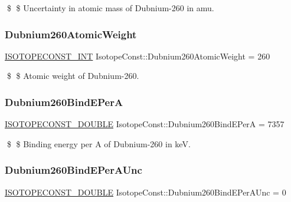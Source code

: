 \$ \$ Uncertainty in atomic mass of Dubnium-\/260 in amu. \mbox{\label{group___isotope_const-_dubnium-_db260_ga7059e4e33c247bd00a7efe8e8356bbd3}} 
\subsubsection{\texorpdfstring{Dubnium260\+Atomic\+Weight}{Dubnium260AtomicWeight}}
{\footnotesize\ttfamily \mbox{\hyperlink{group___isotope_const-_macros_ga5f18360b3e99483a35c32d789e62621c}{I\+S\+O\+T\+O\+P\+E\+C\+O\+N\+S\+T\+\_\+\+I\+NT}} Isotope\+Const\+::\+Dubnium260\+Atomic\+Weight = 260}

\$ \$ Atomic weight of Dubnium-\/260. \mbox{\label{group___isotope_const-_dubnium-_db260_ga88ccf073738560523b8892c3d4b61dd8}} 
\subsubsection{\texorpdfstring{Dubnium260\+Bind\+E\+PerA}{Dubnium260BindEPerA}}
{\footnotesize\ttfamily \mbox{\hyperlink{group___isotope_const-_macros_ga8f45a7272ce02c0b4c65c44636ed719a}{I\+S\+O\+T\+O\+P\+E\+C\+O\+N\+S\+T\+\_\+\+D\+O\+U\+B\+LE}} Isotope\+Const\+::\+Dubnium260\+Bind\+E\+PerA = 7357}

\$ \$ Binding energy per A of Dubnium-\/260 in keV. \mbox{\label{group___isotope_const-_dubnium-_db260_ga51fdf24b8e566b87c4753aa0a578e65e}} 
\subsubsection{\texorpdfstring{Dubnium260\+Bind\+E\+Per\+A\+Unc}{Dubnium260BindEPerAUnc}}
{\footnotesize\ttfamily \mbox{\hyperlink{group___isotope_const-_macros_ga8f45a7272ce02c0b4c65c44636ed719a}{I\+S\+O\+T\+O\+P\+E\+C\+O\+N\+S\+T\+\_\+\+D\+O\+U\+B\+LE}} Isotope\+Const\+::\+Dubnium260\+Bind\+E\+Per\+A\+Unc = 0}

